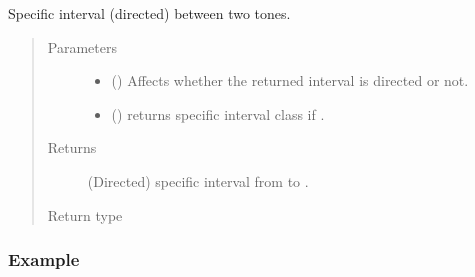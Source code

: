 \documentclass[letterpaper,10pt,english]{sphinxmanual}
\begin{document}
\begin{fulllineitems}
\begin{fulllineitems}
\end{fulllineitems}


\begin{fulllineitems}
\label{\detokenize{api:musictheory.Interval.get_specific_interval}}
Specific interval (directed) between two tones.
\begin{quote}\begin{description}
\item[{Parameters}] \leavevmode\begin{itemize}
\item {} 
 () \textendash{} Affects whether the returned interval is directed or not.

\item {} 
 () \textendash{} returns specific interval class if .

\end{itemize}

\item[{Returns}] \leavevmode
(Directed) specific interval from  to .

\item[{Return type}] \leavevmode
{}

\end{description}\end{quote}
\subsubsection*{Example}


\end{fulllineitems}
\end{fulllineitems}
\end{document}
